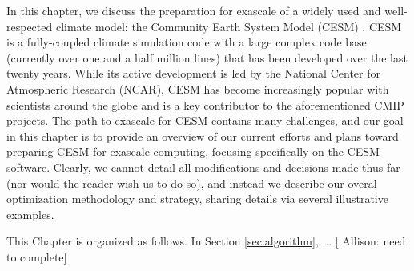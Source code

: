 In this chapter, we discuss the preparation for exascale of a widely used and well-respected climate model: the Community Earth System Model (CESM) \cite{cesm2013}.  CESM is a fully-coupled climate simulation code with a large complex code base (currently over one and a half million lines) that has been developed over the last twenty years.  While its active development is led by the National Center for Atmospheric Research (NCAR), CESM has become increasingly popular with scientists around the globe and is a key contributor to the aforementioned CMIP projects. 
The path to exascale for CESM contains many challenges, and our goal in this chapter is to provide an overview of our current efforts and plans toward preparing CESM for exascale computing, focusing specifically on the CESM software. Clearly, we cannot detail all modifications and decisions made thus far (nor would the reader wish us to do so), and instead we describe our overal optimization methodology and strategy, sharing details via several illustrative examples.

This Chapter is organized as follows. In Section \ref{sec:algorithm}, ... [{\color{red} Allison:} need to complete]
